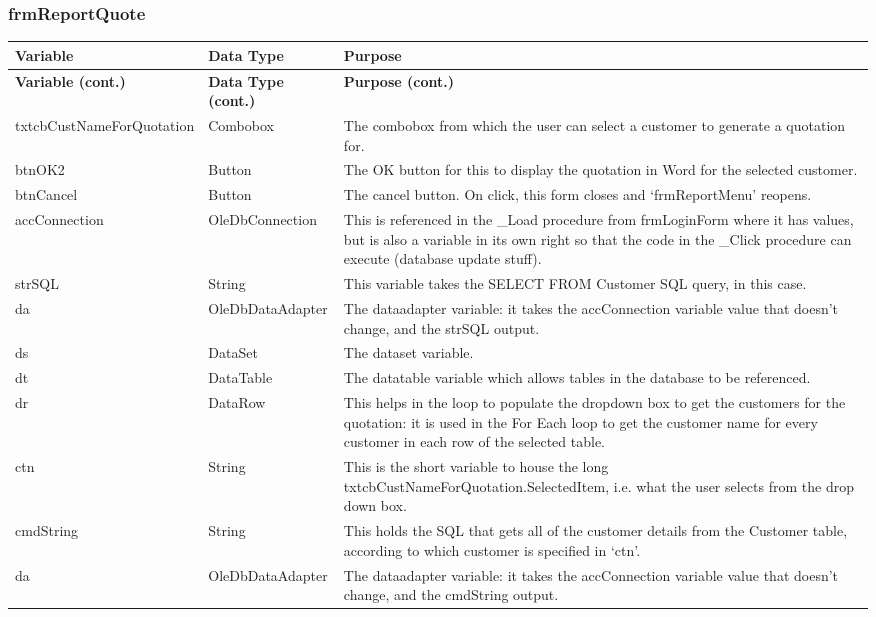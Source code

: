 	\subsubsection{frmReportQuote}
	\begin{longtable}{ | p{4cm} | p{3cm} | p{10cm} |}
		\hline
		\textbf{Variable} & \textbf{Data Type} & \textbf{Purpose}\\
		\endfirsthead
		\hline
		\textbf{Variable (cont.)} & \textbf{Data Type (cont.)} & \textbf{Purpose (cont.)}\\
		\endhead
		\hline
		txtcbCustNameForQuotation & Combobox & The combobox from which the user can select a customer to generate a quotation for.\\
		\hline
		btnOK2 & Button & The OK button for this to display the quotation in Word for the selected customer.\\
		\hline
		btnCancel & Button & The cancel button.  On click, this form closes and `frmReportMenu' reopens.\\ 
		\hline
		accConnection & OleDbConnection & This is referenced in the \_Load procedure from frmLoginForm where it has values, but is also a variable in its own right so that the code in the \_Click procedure can execute (database update stuff).\\
		\hline
		strSQL & String & This variable takes the SELECT FROM Customer SQL query, in this case.\\
		\hline
		da & OleDbDataAdapter & The dataadapter variable: it takes the accConnection variable value that doesn't change, and the strSQL output.\\
		\hline
		ds & DataSet & The dataset variable.\\
		\hline
		dt & DataTable & The datatable variable which allows tables in the database to be referenced.\\
		\hline
		dr & DataRow & This helps in the loop to populate the dropdown box to get the customers for the quotation: it is used in the For Each loop to get the customer name for every customer in each row of the selected table.\\
		\hline
		ctn & String & This is the short variable to house the long txtcbCustNameForQuotation.SelectedItem, i.e. what the user selects from the drop down box.\\
		\hline
		cmdString & String & This holds the SQL that gets all of the customer details from the Customer table, according to which customer is specified in `ctn'.\\
		\hline
		da & OleDbDataAdapter & The dataadapter variable: it takes the accConnection variable value that doesn't change, and the cmdString output.\\

\end{longtable}
